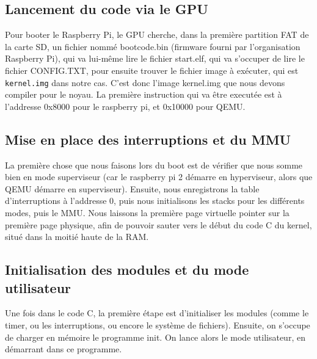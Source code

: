 \documentclass[a4paper]{article}
\begin{document}
\subsection{Lancement du code via le GPU}

Pour booter le Raspberry Pi, le GPU cherche, dans la première partition FAT de la
carte SD, un fichier nommé bootcode.bin (firmware fourni par l'organisation Raspberry Pi),
qui va lui-même lire le fichier start.elf, qui va s'occuper de lire le fichier CONFIG.TXT, pour
ensuite trouver le fichier image à exécuter, qui est \verb!kernel.img! dans notre
cas.
C'est donc l'image kernel.img que nous devons compiler pour le noyau. La
première instruction qui va être executée est à l'addresse 0x8000 pour le
raspberry pi, et 0x10000 pour QEMU.

\subsection{Mise en place des interruptions et du MMU}

La première chose que nous faisons lors du boot est de vérifier que nous somme
bien en mode superviseur (car le raspberry pi 2 démarre en hyperviseur, alors
que QEMU démarre en superviseur). Ensuite, nous enregistrons la table
d'interruptions à l'addresse 0, puis nous initialisons les stacks pour les
différents modes, puis le MMU. Nous laissons la première page virtuelle pointer
sur la première page physique, afin de pouvoir sauter vers le début du code C du
kernel, situé dans la moitié haute de la RAM.

\subsection{Initialisation des modules et du mode utilisateur}

Une fois dans le code C, la première étape est d'initialiser les modules (comme
le timer, ou les interruptions, ou encore le système de fichiers). Ensuite, on
s'occupe de charger en mémoire le programme init. On lance alors le mode
utilisateur, en démarrant dans ce programme.
\end{document}

